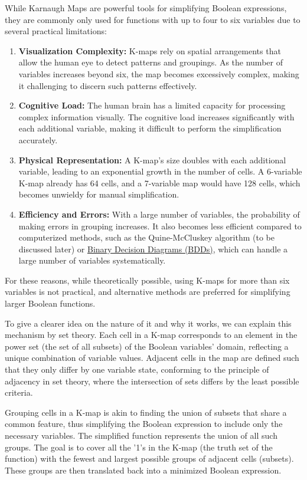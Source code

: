	While Karnaugh Maps are powerful tools for simplifying Boolean expressions, they are commonly only used for functions with up to four to six variables due to several practical limitations:
	\begin{enumerate}
		\item \textbf{Visualization Complexity:} K-maps rely on spatial arrangements that allow the human eye to detect patterns and groupings. As the number of variables increases beyond six, the map becomes excessively complex, making it challenging to discern such patterns effectively.
		\item \textbf{Cognitive Load:} The human brain has a limited capacity for processing complex information visually. The cognitive load increases significantly with each additional variable, making it difficult to perform the simplification accurately.
		\item \textbf{Physical Representation:} A K-map's size doubles with each additional variable, leading to an exponential growth in the number of cells. A 6-variable K-map already has 64 cells, and a 7-variable map would have 128 cells, which becomes unwieldy for manual simplification.
		\item \textbf{Efficiency and Errors:} With a large number of variables, the probability of making errors in grouping increases. It also becomes less efficient compared to computerized methods, such as the Quine-McCluskey algorithm (to be discussed later) or \href{https://www.wikiwand.com/en/Binary_decision_diagram}{Binary Decision Diagrams (BDDs)}, which can handle a large number of variables systematically.
	\end{enumerate}
	
	For these reasons, while theoretically possible, using K-maps for more than six variables is not practical, and alternative methods are preferred for simplifying larger Boolean functions.
	
	
	To give a clearer idea on the nature of it and why it works, we can explain this mechanism by set theory.
	Each cell in a K-map corresponds to an element in the power set (the set of all subsets) of the Boolean variables' domain, reflecting a unique combination of variable values. Adjacent cells in the map are defined such that they only differ by one variable state, conforming to the principle of adjacency in set theory, where the intersection of sets differs by the least possible criteria.
	
	Grouping cells in a K-map is akin to finding the union of subsets that share a common feature, thus simplifying the Boolean expression to include only the necessary variables. The simplified function represents the union of all such groups. The goal is to cover all the '1's in the K-map (the truth set of the function) with the fewest and largest possible groups of adjacent cells (subsets). These groups are then translated back into a minimized Boolean expression.
	
